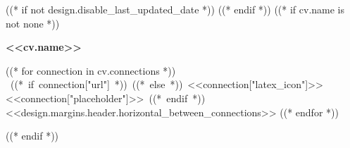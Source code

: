 ((* if not design.disable_last_updated_date *))
\placelastupdatedtext
((* endif *))
((* if cv.name is not none *))
\begin{header}
    \fontsize{<<design.header_font_size>>}{<<design.header_font_size>>}
    \textbf{<<cv.name>>}

    \vspace{<<design.margins.header.vertical_between_name_and_connections>>}

    \normalsize
    ((* for connection in cv.connections *))
    \mbox{
        ((* if connection["url"] *))
        ((* else *))
        {\footnotesize<<connection["latex_icon"]>>}\hspace*{0.13cm}<<connection["placeholder"]>>
        ((* endif *))
    }
    \kern <<design.margins.header.horizontal_between_connections>>
    ((* endfor *))
\end{header}

\vspace{<<design.margins.header.bottom>> - <<design.margins.section_title.top>>}
((* endif *))
